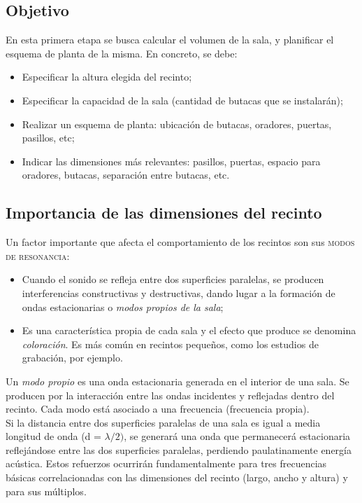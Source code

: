 \subsection{Objetivo}

	En esta primera etapa se busca calcular el volumen de la sala, y planificar el esquema de planta de la misma. En concreto, se debe:

	\begin{itemize}
		\item Especificar la altura elegida del recinto;
		\item Especificar la capacidad de la sala (cantidad de butacas que se instalarán);
		\item Realizar un esquema de planta: ubicación de butacas, oradores, puertas, pasillos, etc;
		\item Indicar las dimensiones más relevantes: pasillos, puertas, espacio para oradores, butacas, separación entre butacas, etc.
	\end{itemize}

\subsection{Importancia de las dimensiones del recinto}

Un factor importante que afecta el comportamiento de los recintos son sus \textsc{modos de resonancia}:

\begin{itemize}
	\item Cuando el sonido se refleja entre dos superficies paralelas, se producen interferencias constructivas y destructivas, dando lugar a la formación de ondas estacionarias o \textit{modos propios de la sala};
	\item Es una característica propia de cada sala y el efecto que produce se denomina \textit{coloración}. Es más común en recintos pequeños, como los estudios de grabación, por ejemplo.
\end{itemize}

Un \textit{modo propio} es una onda estacionaria generada en el interior de una sala. Se producen por la interacción entre las ondas incidentes y reflejadas dentro del recinto. Cada modo está asociado a una frecuencia (frecuencia propia).\\

Si la distancia entre dos superficies paralelas de una sala es igual a media longitud de onda (d = $\lambda/2)$, se generará una onda que permanecerá estacionaria reflejándose entre las dos superficies paralelas, perdiendo paulatinamente energía acústica. Estos refuerzos ocurrirán fundamentalmente para tres frecuencias básicas correlacionadas con las dimensiones del recinto (largo, ancho y altura) y para sus múltiplos.\\

